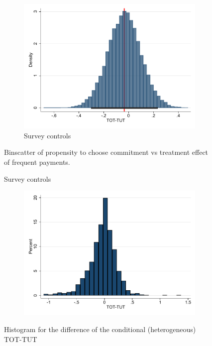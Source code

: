 \documentclass[oneside,11pt]{article}
\begin{document}
\begin{figure}[H]
\begin{center}
\begin{subfigure}{0.475\textwidth}
        \caption{Survey controls}
        \centering
        \includegraphics[width=\textwidth]{Figuras/tot_tut_btsp3.pdf}
    \end{subfigure}
  
    \end{center}
     \scriptsize    Binscatter of propensity to choose commitment vs treatment effect of frequent payments.
\end{figure}





\begin{figure}[H]
     \caption{TOT-TUT Histogram}
    \label{}
    \begin{center}
    \begin{subfigure}{0.75\textwidth}
        \centering
        \includegraphics[width=\textwidth]{Figuras/dif_tot_tut.pdf}
    \end{subfigure}
    \end{center}
    \scriptsize
        Histogram for the difference of the conditional (heterogeneous) TOT-TUT
\end{figure}
\end{document}
